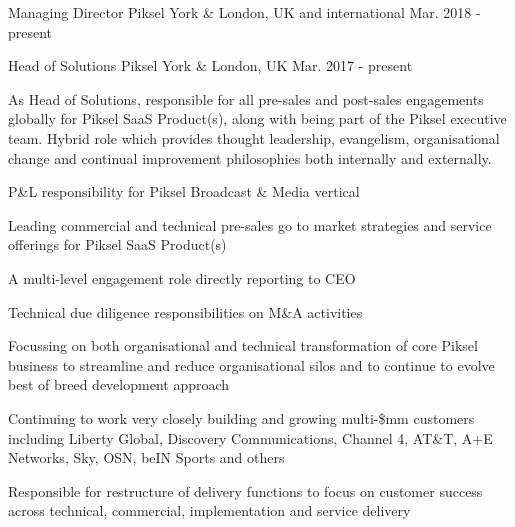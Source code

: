 


\begin{cventries}


\cvexpentry
{Managing Director} %
{Piksel} %
{York \& London, UK and international} %
{Mar. 2018 - present} %
{
\begin{cvitemstitle}
\end{cvitemstitle}
}
{ %
\begin{cvitems}
\end{cvitems}
}


\cvexpentry
{Head of Solutions} %
{Piksel} %
{York \& London, UK} %
{Mar. 2017 - present} %
{
\begin{cvitemstitle}
\item {As Head of Solutions, responsible for all pre-sales and post-sales engagements globally for Piksel SaaS Product(s), along with being part of the Piksel executive team. Hybrid role which provides thought leadership, evangelism, organisational change and continual improvement philosophies both internally and externally.}
\end{cvitemstitle}
}
{ %
\begin{cvitems}
\item {P\&L responsibility for Piksel Broadcast \& Media vertical}
\item {Leading commercial and technical pre-sales go to market strategies and service offerings for Piksel SaaS Product(s)}
\item {A multi-level engagement role directly reporting to CEO}
\item {Technical due diligence responsibilities on M\&A activities}
\item {Focussing on both organisational and technical transformation of core Piksel business to streamline and reduce organisational silos and to continue to evolve best of breed development approach}
\item {Continuing to work very closely building and growing multi-\$mm customers including Liberty Global, Discovery Communications, Channel 4, AT\&T, A+E Networks, Sky, OSN, beIN Sports and others}
\item {Responsible for restructure of delivery functions to focus on customer success across technical, commercial, implementation and service delivery}
\end{cvitems}
}


\end{cventries}
